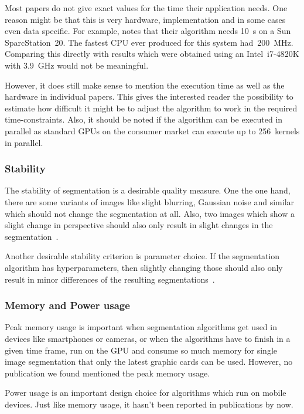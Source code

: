 Most papers do not give exact values for the time their application needs. One
reason might be that this is very hardware, implementation and in some cases
even data specific. For example, \cite{hoover1996experimental} notes that their
algorithm needs \SI{10}{\second} on a Sun SparcStation~20. The fastest CPU ever
produced for this system had~\SI{200}{\mega\hertz}. Comparing this directly
with results which were obtained using an Intel~i7-4820K with
\SI{3.9}{\giga\hertz} would not be meaningful.

However, it does still make sense to mention the execution time as well as the
hardware in individual papers. This gives the interested reader the possibility
to estimate how difficult it might be to adjust the algorithm to work in the
required time-constraints. Also, it should be noted if the algorithm can be
executed in parallel as standard \glspl{GPU} on the consumer market can execute
up to 256~kernels in parallel.



\subsubsection{Stability}%
\label{subsubsec:stability-quality-measure}%
The stability of segmentation is a desirable quality measure. One the one hand,
there are some variants of images like slight blurring, Gaussian noise and
similar which should not change the segmentation at all. Also, two images which
show a slight change in perspective should also only result in slight changes
in the segmentation~\cite{pantofaru2005comparison}.

Another desirable stability criterion is parameter choice. If the
segmentation algorithm has hyperparameters, then slightly changing those should
also only result in minor differences of the resulting
segmentations~\cite{pantofaru2005comparison}.


\subsubsection{Memory and Power usage}
Peak memory usage is important when segmentation algorithms get used in devices
like smartphones or cameras, or when the algorithms have to finish in a given
time frame, run on the \gls{GPU} and consume so much memory for single image
segmentation that only the latest graphic cards can be used. However, no
publication we found mentioned the peak memory usage.

Power usage is an important design choice for algorithms which run on mobile
devices. Just like memory usage, it hasn't been reported in publications by
now.
